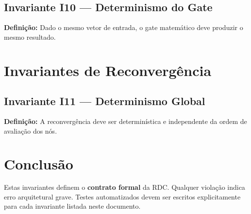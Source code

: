\documentclass[12pt,a4paper]{article}
\begin{document}
	\subsection{Invariante I10 — Determinismo do Gate}
	
	\textbf{Definição:}  
	Dado o mesmo vetor de entrada, o gate matemático deve produzir o mesmo resultado.
	
	\section{Invariantes de Reconvergência}
	
	\subsection{Invariante I11 — Determinismo Global}
	
	\textbf{Definição:}  
	A reconvergência deve ser determinística e independente da ordem
	de avaliação dos nós.
	
	\section{Conclusão}
	
	Estas invariantes definem o \textbf{contrato formal} da RDC.
	Qualquer violação indica erro arquitetural grave.
	Testes automatizados devem ser escritos explicitamente para cada
	invariante listada neste documento.
	
\end{document}
